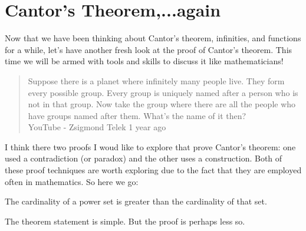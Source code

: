 \section{Cantor's Theorem,...again}
Now that we have been thinking about Cantor's theorem, infinities, and functions for a while, let's have another fresh look at the proof of Cantor's theorem.  This time we will be armed with tools and skills to discuss it like mathematicians!

\begin{quotation}
\noindent Suppose there is a planet where infinitely many people live. They form every possible group. Every group is uniquely named after a person who is not in that group. Now take the group where there are all the people who have groups named after them. What's the name of it then?\\

\hfill YouTube - Zsigmond Telek  1 year ago
\end{quotation}

I think there two proofs I woud like to explore that prove Cantor's theorem: one used a contradiction (or paradox) and the other uses a construction.  Both of these proof techniques are worth exploring due to the fact that they are employed often in mathematics.  So here we go:

\begin{theorem}
The cardinality of a power set is greater than the cardinality of that set.
\end{theorem}

The theorem statement is simple.  But the proof is perhaps less so.

